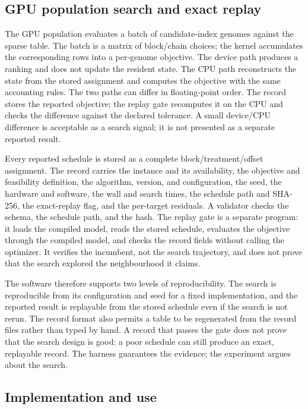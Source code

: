 \documentclass[a4paper,fleqn]{cas-sc}
\begin{document}
\subsection{GPU population search and exact replay}

The GPU population evaluates a batch of candidate-index genomes against the sparse table. The batch is
a matrix of block/chain choices; the kernel accumulates the corresponding rows into a per-genome
objective. The device path produces a ranking and does not update the resident state. The CPU path
reconstructs the state from the stored assignment and computes the objective with the same accounting
rules. The two paths can differ in floating-point order. The record stores the reported objective;
the replay gate recomputes it on the CPU and checks the difference against the declared tolerance. A
small device/CPU difference is acceptable as a search signal; it is not presented as a separate
reported result.

Every reported schedule is stored as a complete block/treatment/offset assignment. The record carries
the instance and its availability, the objective and feasibility definition, the algorithm, version,
and configuration, the seed, the hardware and software, the wall and search times, the schedule path
and SHA-256, the exact-replay flag, and the per-target residuals. A validator checks the schema, the
schedule path, and the hash. The replay gate is a separate program: it loads the compiled model, reads
the stored schedule, evaluates the objective through the compiled model, and checks the record fields without
calling the optimizer. It verifies the incumbent, not the search trajectory, and does not prove that
the search explored the neighbourhood it claims.

The software therefore supports two levels of reproducibility. The search is reproducible from its
configuration and seed for a fixed implementation, and the reported result is replayable from the
stored schedule even if the search is not rerun. The record format also permits a table to be
regenerated from the record files rather than typed by hand. A record that passes the gate does not
prove that the search design is good: a poor schedule can still produce an exact, replayable record. The harness guarantees
the evidence; the experiment argues about the search.

\subsection{Implementation and use}
\end{document}
